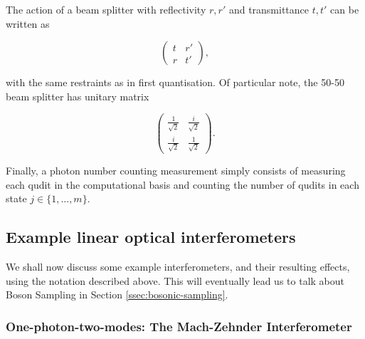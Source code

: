 The action of a beam splitter with reflectivity $r, r'$ and transmittance $t, t'$ can be written as

\begin{equation}
\begin{pmatrix}
t & r'\\
r & t'
\end{pmatrix},
\end{equation}

\noindent with the same restraints as in first quantisation. Of particular note, the 50-50 beam splitter has unitary matrix

\begin{equation}
\begin{pmatrix}
\frac{1}{\sqrt{2}} & \frac{i}{\sqrt{2}}\\
\frac{i}{\sqrt{2}} & \frac{1}{\sqrt{2}}
\end{pmatrix}.
\end{equation}

Finally, a photon number counting measurement simply consists of measuring each qudit in the computational basis and counting the number of qudits in each state $j \in \{1,\dots,m\}$.

\subsection{Example linear optical interferometers}
\label{ssec:example-interferometers}

We shall now discuss some example interferometers, and their resulting effects, using the notation described above. This will eventually lead us to talk about Boson Sampling in Section \ref{ssec:bosonic-sampling}.

\subsubsection{One-photon-two-modes: The Mach-Zehnder Interferometer}

